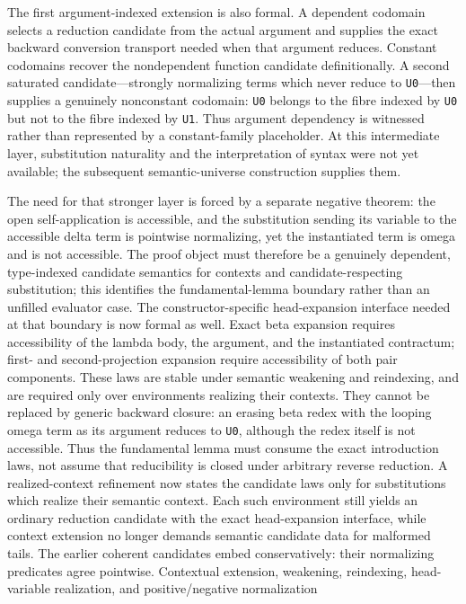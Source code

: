 \documentclass[11pt]{article}
\newcommand{\code}[1]{\texttt{#1}}
\begin{document}
The first argument-indexed extension is also formal.  A dependent codomain
selects a reduction candidate from the actual argument and supplies the exact
backward conversion transport needed when that argument reduces.  Constant
codomains recover the nondependent function candidate definitionally.  A second
saturated candidate---strongly normalizing terms which never reduce to
\code{U0}---then supplies a genuinely nonconstant codomain: \code{U0} belongs to
the fibre indexed by \code{U0} but not to the fibre indexed by \code{U1}.  Thus
argument dependency is witnessed rather than represented by a constant-family
placeholder.  At this intermediate layer, substitution naturality and the
interpretation of syntax were not yet available; the subsequent semantic-universe
construction supplies them.

The need for that stronger layer is forced by a separate negative theorem: the open
self-application is accessible, and the substitution sending its variable to
the accessible delta term is pointwise normalizing, yet the instantiated term
is omega and is not accessible.  The proof object must therefore be a
genuinely dependent, type-indexed candidate semantics for contexts and
candidate-respecting substitution; this identifies the fundamental-lemma
boundary rather than an unfilled evaluator case.
The constructor-specific head-expansion interface needed at that boundary is
now formal as well.  Exact beta expansion requires accessibility of the lambda
body, the argument, and the instantiated contractum; first- and
second-projection expansion require accessibility of both pair components.
These laws are stable under semantic weakening and reindexing, and are required
only over environments realizing their contexts.  They cannot be replaced by
generic backward closure: an erasing beta redex with the looping omega term as
its argument reduces to \code{U0}, although the redex itself is not accessible.
Thus the fundamental lemma must consume the exact introduction laws,
not assume that reducibility is closed under arbitrary reverse reduction.
A realized-context refinement now states the candidate laws only for
substitutions which realize their semantic context.  Each such environment
still yields an ordinary reduction candidate with the exact head-expansion
interface, while context extension no longer demands semantic candidate data
for malformed tails.  The earlier coherent candidates embed conservatively:
their normalizing predicates agree pointwise.  Contextual extension, weakening,
reindexing, head-variable realization, and positive/negative normalization
\end{document}
